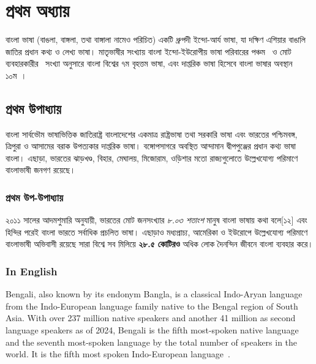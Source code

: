 \section{প্রথম অধ্যায়}
বাংলা ভাষা (বাঙলা, বাঙ্গলা, তথা বাঙ্গালা নামেও পরিচিত) একটি ধ্রুপদী ইন্দো-আর্য ভাষা, যা দক্ষিণ এশিয়ার বাঙালি জাতির প্রধান কথ্য ও লেখ্য ভাষা। মাতৃভাষীর সংখ্যায় বাংলা ইন্দো-ইউরোপীয় ভাষা পরিবারের পঞ্চম~\cite{reference1} ও মোট ব্যবহারকারীর~\cite{reference2} সংখ্যা অনুসারে বাংলা বিশ্বের ৭ম বৃহত্তম ভাষা, এবং দাপ্তরিক ভাষা হিসেবে বাংলা ভাষার অবস্থান ১০ম~\cite{ক০২}।

\subsection{প্রথম উপাধ্যায়}
বাংলা সার্বভৌম ভাষাভিত্তিক জাতিরাষ্ট্র বাংলাদেশের একমাত্র রাষ্ট্রভাষা তথা সরকারি ভাষা এবং ভারতের পশ্চিমবঙ্গ, ত্রিপুরা ও আসামের বরাক উপত্যকার দাপ্তরিক ভাষা। বঙ্গোপসাগরে অবস্থিত আন্দামান দ্বীপপুঞ্জের প্রধান কথ্য ভাষা বাংলা। এছাড়া, ভারতের ঝাড়খণ্ড, বিহার, মেঘালয়, মিজোরাম, ওড়িশার মতো রাজ্যগুলোতে উল্লেখযোগ্য পরিমাণে বাংলাভাষী জনগণ রয়েছে। 

\subsubsection{প্রথম উপ-উপাধ্যায়}
২০১১ সালের আদমশুমারি অনুযায়ী, ভারতের মোট জনসংখ্যার \textit{৮.০৩ শতাংশ} মানুষ বাংলা ভাষায় কথা বলে[১২] এবং হিন্দির পরেই বাংলা ভারতে সর্বাধিক প্রচলিত ভাষা। এছাড়াও মধ্যপ্রাচ্য, আমেরিকা ও ইউরোপে উল্লেখযোগ্য পরিমাণে বাংলাভাষী অভিবাসী রয়েছে সারা বিশ্বে সব মিলিয়ে \textbf{২৮.৫ কোটিরও} অধিক লোক দৈনন্দিন জীবনে বাংলা ব্যবহার করে।

\subsubsection{\englishfont In English}
{\englishfont 
Bengali, also known by its endonym Bangla, is a classical Indo-Aryan language from the Indo-European language family native to the Bengal region of South Asia. With over 237 million native speakers and another 41 million as second language speakers as of 2024, Bengali is the fifth most-spoken native language and the seventh most-spoken language by the total number of speakers in the world. It is the fifth most spoken Indo-European language~\cite{reference2}.
}
